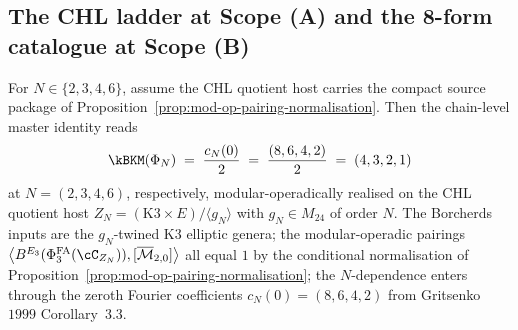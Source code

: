 \subsection{The CHL ladder at Scope (A) and the 8-form catalogue at Scope (B)}
\label{subsec:scopes-a-b-master-identity}

\begin{corollary}
\label{cor:master-chl-chapter}
For $N \in \{2, 3, 4, 6\}$, assume the CHL quotient host carries the
compact source package of
Proposition~\ref{prop:mod-op-pairing-normalisation}. Then the
chain-level master identity reads
\[
 \kBKM(\Phi_N) \;=\; \frac{c_N(0)}{2} \;=\; \frac{(8, 6, 4, 2)}{2}
 \;=\; (4, 3, 2, 1)
\]
at $N = (2, 3, 4, 6)$, respectively, modular-operadically realised
on the CHL quotient host $Z_N = (\mathrm{K3} \times E)/\langle g_N \rangle$
with $g_N \in M_{24}$ of order $N$. The Borcherds inputs are the
$g_N$-twined K3 elliptic genera; the modular-operadic pairings
$\bigl\langle B^{E_3}(\PhiFA_3(\cC_{Z_N})), [\Mbar_{2, 0}]\bigr\rangle$
all equal $1$ by the conditional normalisation of
Proposition~\ref{prop:mod-op-pairing-normalisation}; the $N$-dependence
enters through the zeroth Fourier coefficients $c_N(0) = (8, 6, 4, 2)$
from Gritsenko $1999$ Corollary~$3.3$.
\end{corollary}

